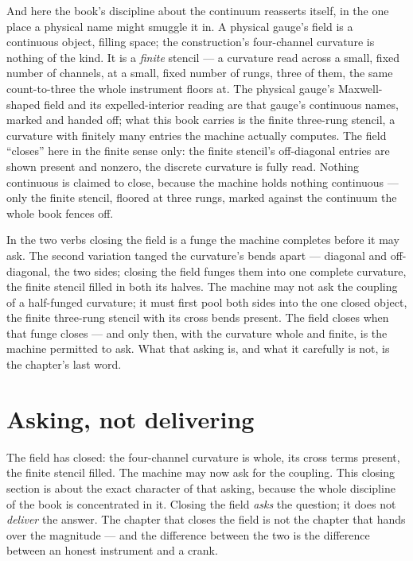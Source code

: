 And here the book's discipline about the continuum reasserts itself, in the one place a physical name might smuggle it
in. A physical gauge's field is a continuous object, filling space; the construction's four-channel curvature is nothing
of the kind. It is a \emph{finite} stencil --- a curvature read across a small, fixed number of channels, at a small,
fixed number of rungs, three of them, the same count-to-three the whole instrument floors at. The physical gauge's
Maxwell-shaped field and its expelled-interior reading are that gauge's continuous names, marked and handed off; what
this book carries is the finite three-rung stencil, a curvature with finitely many entries the machine actually computes.
The field ``closes'' here in the finite sense only: the finite stencil's off-diagonal entries are shown present and
nonzero, the discrete curvature is fully read. Nothing continuous is claimed to close, because the machine holds nothing
continuous --- only the finite stencil, floored at three rungs, marked against the continuum the whole book fences off.

In the two verbs closing the field is a funge the machine completes before it may ask. The second variation tanged the
curvature's bends apart --- diagonal and off-diagonal, the two sides; closing the field funges them into one complete
curvature, the finite stencil filled in both its halves. The machine may not ask the coupling of a half-funged curvature;
it must first pool both sides into the one closed object, the finite three-rung stencil with its cross bends present. The
field closes when that funge closes --- and only then, with the curvature whole and finite, is the machine permitted to
ask. What that asking is, and what it carefully is not, is the chapter's last word.

\section{Asking, not delivering}

The field has closed: the four-channel curvature is whole, its cross terms present, the finite stencil filled. The
machine may now ask for the coupling. This closing section is about the exact character of that asking, because the whole
discipline of the book is concentrated in it. Closing the field \emph{asks} the question; it does not \emph{deliver} the
answer. The chapter that closes the field is not the chapter that hands over the magnitude --- and the difference between
the two is the difference between an honest instrument and a crank.


